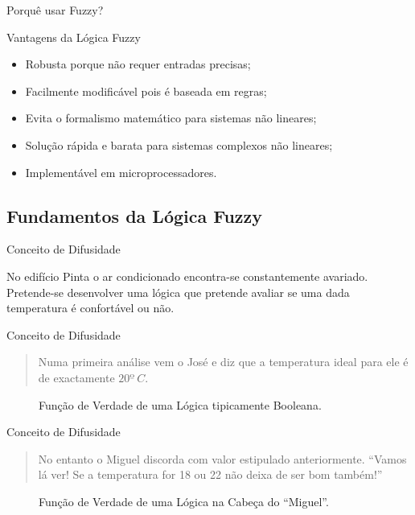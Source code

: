 \documentclass[portuges]{beamer}
\begin{document}
\begin{frame}{Porquê usar Fuzzy?}
\begin{block}{Vantagens da Lógica Fuzzy}
\begin{itemize}
	\item<1-> Robusta porque não requer entradas precisas;
	\item<2-> Facilmente modificável pois é baseada em regras;
	\item<3-> Evita o formalismo matemático para sistemas não lineares;
	\item<3-> Solução rápida e barata para sistemas complexos não lineares;
	\item<4-> Implementável em microprocessadores.
\end{itemize}
\end{block}
\end{frame}


\subsection{Fundamentos da Lógica Fuzzy}

\begin{frame}{Conceito de Difusidade}
	\begin{figure}
			\centering
	\end{figure}
		
	\begin{example}
  		No edifício Pinta o ar condicionado encontra-se constantemente
		avariado. Pretende-se desenvolver uma lógica que pretende 
		avaliar se uma dada temperatura é \alert{confortável} ou não.
	\end{example}
\end{frame}

\begin{frame}{Conceito de Difusidade}
	\begin{quote}
		Numa primeira análise vem o José e diz que a temperatura ideal
		para ele é de exactamente $20º\ C$.
	\end{quote}
	\begin{figure}
			\centering
			\caption{Função de Verdade de uma Lógica tipicamente Booleana.}
	\end{figure}
\end{frame}

\begin{frame}{Conceito de Difusidade}
	\begin{quote}
		No entanto o Miguel discorda com valor estipulado anteriormente. ``Vamos
		lá ver! Se a temperatura for 18 ou 22 não deixa de ser bom também!'' 
	\end{quote}
	\begin{figure}
			\centering
			\caption{Função de Verdade de uma Lógica na Cabeça do ``Miguel''.}
	\end{figure}
\end{frame}
\end{document}
